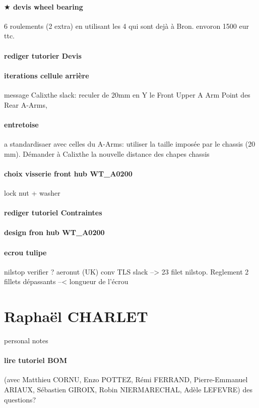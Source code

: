 \paragraph{$\bigstar$ devis wheel bearing}  6 roulements (2 extra) en utilisant les 4 qui sont dejà à Bron. envoron 1500 eur ttc. 
\paragraph{rediger tutorier Devis} 
\paragraph{iterations cellule arrière} message Calixthe slack: reculer de 20mm en Y le Front Upper A Arm Point  des Rear A-Arms,
\paragraph{entretoise}  a standardisaer avec celles du A-Arms: utiliser la taille imposée par le chassis (20 mm). Démander à Calixthe la nouvelle distance des chapes chassis 
\paragraph{choix visserie front hub WT\_A0200} lock nut + washer 
\paragraph{rediger tutoriel Contraintes} 
\paragraph{design fron hub WT\_A0200} 
\paragraph{ecrou tulipe} nilstop verifier ? aeronut (UK) conv TLS slack --> 23 filet nilstop. Reglement 2 fillets dépassants --< longueur de l'écrou

 
 \newpage \section*{Raphaël CHARLET} 
 \par personal notes
\paragraph{lire tutoriel BOM} (avec Matthieu CORNU, Enzo POTTEZ, Rémi FERRAND, Pierre-Emmanuel ARIAUX, Sébastien GIROIX, Robin NIERMARECHAL, Adèle LEFEVRE) des questions?
